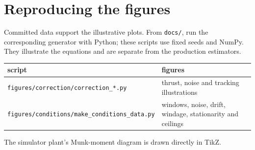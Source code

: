 \section{Reproducing the figures}
\label{app:figures}

Committed data support the illustrative plots. From \texttt{docs/}, run the
corresponding generator with Python; these scripts use fixed seeds and NumPy.
They illustrate the equations and are separate from the production estimators.
\begin{center}
\small
\begin{tabular}{@{}ll@{}}
 \toprule
 script & figures\\
 \midrule
 \texttt{figures/correction/correction\_*.py} & thrust, noise and tracking illustrations\\
 \texttt{figures/conditions/make\_conditions\_data.py} & windows, noise, drift, windage, stationarity and ceilings\\
 \bottomrule
\end{tabular}
\end{center}
The simulator plant's Munk-moment diagram is drawn directly in TikZ.

